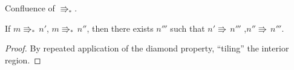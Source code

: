 \begin{thm} Confluence of $\Rrightarrow_{\ast}$.
\label{thm:conf-par-red}
 
If $m\Rrightarrow_{\ast}\,n'$, $m\Rrightarrow_{\ast}\,n''$, then there exists $n'''$ such that $n'\Rrightarrow\,n'''$ ,$n''\Rrightarrow\,n'''$.
\end{thm}
\begin{proof}
By repeated application of the diamond property, ``tiling'' the interior region.

\end{proof}

